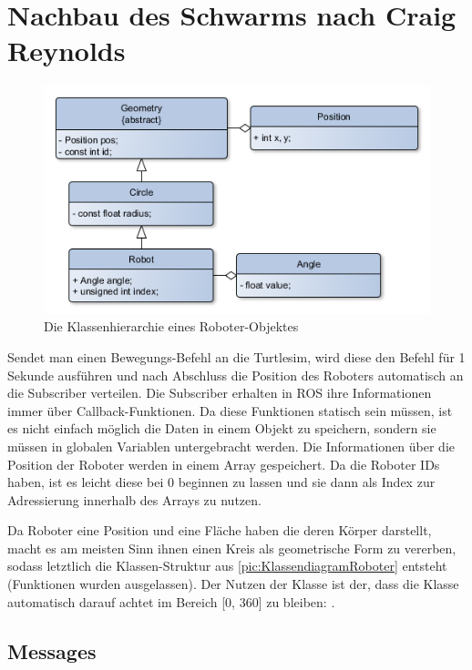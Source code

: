 \section{Nachbau des Schwarms nach Craig Reynolds}

\begin{figure}
	\includegraphics[width=\pictureWidth,keepaspectratio]{graphics/Klassendiagramme/KlassendiagrammRobot.png}
	\caption{Die Klassenhierarchie eines Roboter-Objektes}
	\label{pic:KlassendiagramRoboter}
\end{figure}

Sendet man einen Bewegungs-Befehl an die Turtlesim, wird diese den Befehl für 1 Sekunde ausführen und nach Abschluss die Position des Roboters automatisch an die Subscriber verteilen. Die Subscriber erhalten in ROS ihre Informationen immer über Callback-Funktionen. Da diese Funktionen statisch sein müssen, ist es nicht einfach möglich die Daten in einem Objekt zu speichern, sondern sie müssen in globalen Variablen untergebracht werden.
Die Informationen über die Position der Roboter werden in einem Array gespeichert. Da die Roboter IDs haben, ist es leicht diese bei 0 beginnen zu lassen und sie dann als Index zur Adressierung innerhalb des Arrays zu nutzen.

Da Roboter eine Position und eine Fläche haben die deren Körper darstellt, macht es am meisten Sinn ihnen einen Kreis als geometrische Form zu vererben, sodass letztlich die Klassen-Struktur aus \autoref{pic:KlassendiagramRoboter} entsteht (Funktionen wurden ausgelassen). Der Nutzen der Klasse  ist der, dass die Klasse automatisch darauf achtet im Bereich [0, 360] zu bleiben: .

\subsection*{Messages}

